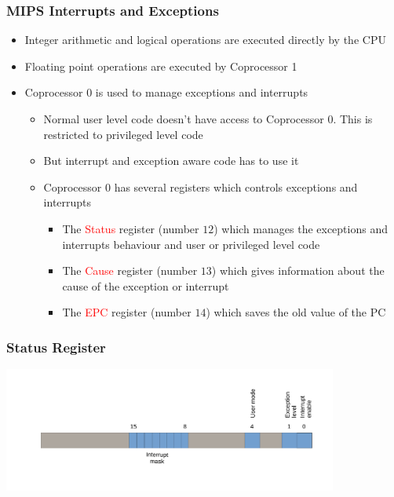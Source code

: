 \documentclass{beamer}
\begin{document}
\begin{frame}%
\frametitle{MIPS Interrupts and Exceptions}

\begin{itemize}

\item Integer arithmetic and logical operations are executed directly by the CPU
  \vspace{0.3cm}
\item Floating point operations are executed by Coprocessor 1
  \vspace{0.3cm}
\item Coprocessor 0 is used to manage exceptions and interrupts
  \begin{itemize}
    \scriptsize
\item Normal user level code doesn't have access to Coprocessor 0. This is restricted to privileged level code
\item But interrupt and exception aware code has to use it
\item Coprocessor 0 has several registers which controls exceptions and interrupts
  \begin{itemize}
    \scriptsize
  \item The \textcolor{red}{Status} register (number $12$) which manages the exceptions and interrupts behaviour and user or privileged
    level code
  \item The \textcolor{red}{Cause} register (number $13$) which gives information about the cause of the exception or interrupt
  \item The \textcolor{red}{EPC} register (number $14$) which saves the old value of the PC
  \end{itemize}
\end{itemize}

\end{itemize}

\end{frame}

\begin{frame}%
\frametitle{Status Register}

\begin{center}
  \includegraphics[width=11cm]{status_register.pdf}
\end{center}

\end{frame}
\end{document}
